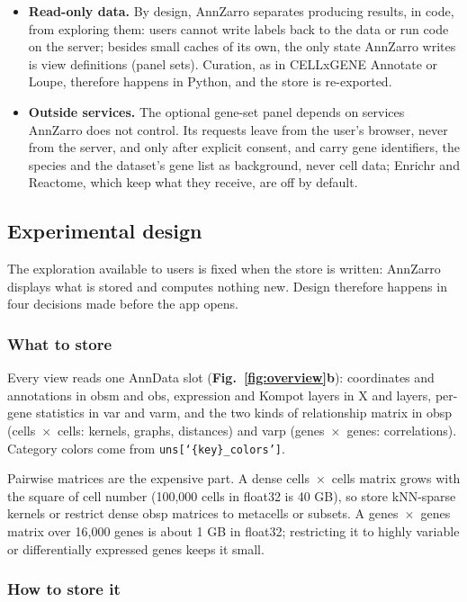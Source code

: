 \begin{itemize}
\item
  \textbf{Read-only data.} By design, AnnZarro separates producing results, in code, from exploring them: users cannot write labels back to the data or run code on the server; besides small caches of its own, the only state AnnZarro writes is view definitions (panel sets). Curation, as in CELLxGENE Annotate or Loupe, therefore happens in Python, and the store is re-exported.
\item
  \textbf{Outside services.} The optional gene-set panel depends on services AnnZarro does not control. Its requests leave from the user's browser, never from the server, and only after explicit consent, and carry gene identifiers, the species and the dataset's gene list as background, never cell data; Enrichr and Reactome, which keep what they receive, are off by default.
\end{itemize}

\subsection{Experimental design}

The exploration available to users is fixed when the store is written: AnnZarro displays what is stored and computes nothing new. Design therefore happens in four decisions made before the app opens.

\subsubsection{What to store}

Every view reads one AnnData slot (\textbf{Fig.~\ref{fig:overview}b}): coordinates and annotations in obsm and obs, expression and Kompot layers in X and layers, per-gene statistics in var and varm, and the two kinds of relationship matrix in obsp (cells~$\times$~cells: kernels, graphs, distances) and varp (genes~$\times$~genes: correlations). Category colors come from \texttt{uns[`\{key\}\_colors']}.

Pairwise matrices are the expensive part. A dense cells~$\times$~cells matrix grows with the square of cell number (100,000 cells in float32 is 40 GB), so store kNN-sparse kernels or restrict dense obsp matrices to metacells or subsets. A genes~$\times$~genes matrix over 16,000 genes is about 1 GB in float32; restricting it to highly variable or differentially expressed genes keeps it small.

\subsubsection{How to store it}

